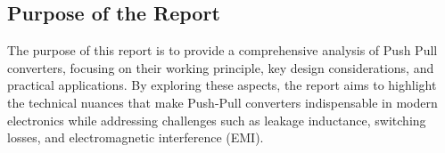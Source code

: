 \subsection{Purpose of the Report}
\noindent The purpose of this report is to provide a comprehensive analysis of Push Pull converters, focusing on their working principle, key design considerations, and practical applications. By exploring these aspects, the report aims to highlight the technical nuances that make Push-Pull converters indispensable in modern electronics while addressing challenges such as leakage inductance, switching losses, and electromagnetic interference (EMI).

